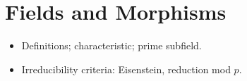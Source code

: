 \section{Fields and Morphisms}
\begin{itemize}
  \item Definitions; characteristic; prime subfield.
  \item Irreducibility criteria: Eisenstein, reduction mod $p$.
\end{itemize}
